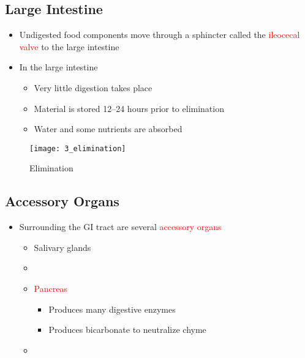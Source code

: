 \documentclass[title={Chapter 3}]{fdsn201notes}
\begin{document}
\subsection{Large Intestine}\label{subsec:large-intestine}
\begin{itemize}
	\item Undigested food components move through a sphincter called the \textcolor{red}{ileocecal valve} to the large intestine
	\item In the large intestine
	\begin{itemize}
		\item Very little digestion takes place
		\item Material is stored 12--24 hours prior to elimination
		\item Water and some nutrients are absorbed
	\end{itemize}
\end{itemize}

\begin{figure}[H]
	\centering
	\texttt{[image: 3\_elimination]}
	\caption{Elimination}
	\label{fig:elimination}
\end{figure}

\subsection{Accessory Organs}\label{subsec:accessory-organs}
\begin{itemize}
	\item Surrounding the GI tract are several \textcolor{red}{accessory organs}
	\begin{itemize}
		\item Salivary glands
		\item {}
		\item \textcolor{red}{Pancreas}
		\begin{itemize}
			\item Produces many digestive enzymes
			\item Produces bicarbonate to neutralize chyme
		\end{itemize}
		\item {}
	\end{itemize}
\end{itemize}
\end{document}
